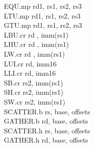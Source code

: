 {EQU.mp      rd1,         rs1, rs2, rs3 \\
LTU.mp      rd1,         rs1, rs2, rs3 \\
GTU.mp      rd1,         rs1, rs2, rs3 \\
LBU.cr      rd , imm(rs1)           \\
LHU.cr      rd , imm(rs1)           \\
LW.cr       rd , imm(rs1)           \\
LUI.cr      rd,  imm16              \\
LLI.cr      rd,  imm16              \\
SB.cr       rs2, imm(rs1)           \\
SH.cr       rs2, imm(rs1)           \\
SW.cr       rs2, imm(rs1)           \\
SCATTER.b   rs, base, offsets       \\
GATHER.b    rd, base, offsets       \\
SCATTER.h   rs, base, offsets       \\
GATHER.h    rd, base, offsets       \\
}


